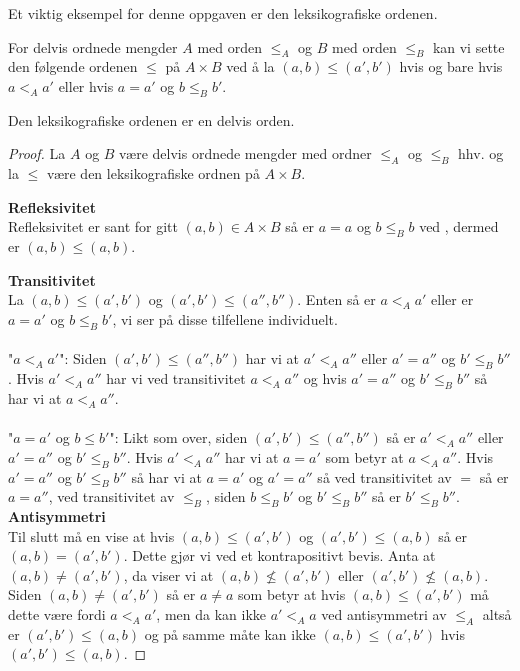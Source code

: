 Et viktig eksempel for denne oppgaven er den leksikografiske ordenen.

\begin{example}\label{Ex:LeksOrd}
    For delvis ordnede mengder $A$ med orden $\leq_A$ og $B$ med orden $\leq_B$ kan vi sette den følgende ordenen $\leq$ på $A\times B$ ved å la $(a,b)\leq (a',b')$ hvis og bare hvis $a<_A a'$ eller hvis $a=a'$ og $b\leq_B b'$. 
\end{example}

\begin{proposition}\label{prop:LeksOrd}
    Den leksikografiske ordenen er en delvis orden.
\end{proposition}
\begin{proof}
    La $A$ og $B$ være delvis ordnede mengder med ordner $\leq_A$ og $\leq_B$ hhv. og la $\leq$ være den leksikografiske ordnen på $A\times B$. 

    \textbf{Refleksivitet}\\
    Refleksivitet er sant for gitt $(a,b)\in A\times B$ så er $a=a$ og $b\leq_B b$ ved , dermed er $(a,b)\leq (a,b)$.

    \textbf{Transitivitet}\\
    La $(a,b)\leq (a',b')$ og $(a',b')\leq (a'',b'')$. Enten så er $a<_A a'$ eller er $a=a'$ og $b\leq_B b'$, vi ser på disse tilfellene individuelt.\\\\
    "$a<_A a'$": Siden $(a',b')\leq (a'',b'')$ har vi at $a'<_A a''$ eller $a'=a''$ og $b'\leq_B b''$. 
    Hvis $a'<_A a''$ har vi ved transitivitet $a<_A a''$ og hvis $a'=a''$ og $b'\leq_B b''$ så har vi at $a<_A a''$.\\\\
    "$a=a'$ og $b\leq b'$": Likt som over, siden $(a',b')\leq (a'',b'')$ så er $a'<_A a''$ eller $a'=a''$ og $b'\leq_B b''$. Hvis $a'<_A a''$ har vi at $a=a'$ som betyr at $a<_A a''$. Hvis $a'=a''$ og $b'\leq_B b''$ så har vi at $a=a'$ og $a'=a''$ så ved transitivitet av $=$ så er $a=a''$, ved transitivitet av $\leq_B$, siden $b\leq_B b'$ og $b'\leq_B b''$ så er $b'\leq_B b''$.\\

    \textbf{Antisymmetri}\\
    Til slutt må en vise at hvis $(a,b)\leq(a',b')$ og $(a',b')\leq (a,b)$ så er $(a,b)=(a',b')$.
    Dette gjør vi ved et kontrapositivt bevis. Anta at $(a,b)\neq (a',b')$, da viser vi at $(a,b)\not\leq (a',b')$ eller $(a',b')\not\leq (a,b)$.
    Siden $(a,b)\neq (a',b')$ så er $a\neq a$ som betyr at hvis $(a,b)\leq (a',b')$ må dette være fordi $a<_A a'$, men da kan ikke $a'<_A a$ ved antisymmetri av $\leq_A$ altså er $(a',b')\leq (a,b)$ og på samme måte kan ikke $(a,b)\leq (a',b')$ hvis $(a',b')\leq (a,b)$.


\end{proof}
